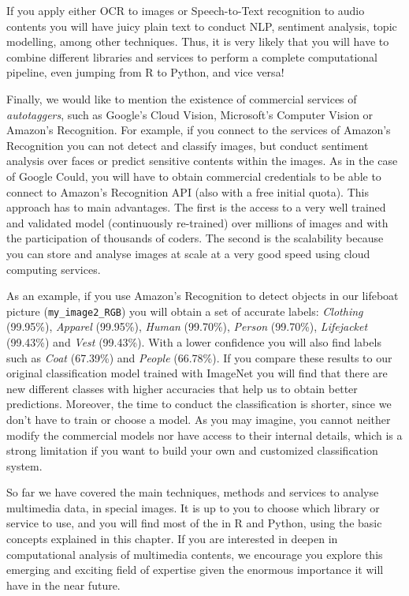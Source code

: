 If you apply either OCR to images or Speech-to-Text recognition to audio contents you will have juicy plain text to conduct NLP, sentiment analysis, topic modelling, among other techniques.  Thus, it is very likely that you will have to combine different libraries and services to perform a complete computational pipeline, even jumping from R to Python, and vice versa!

Finally, we would like to mention the existence of commercial services of \textit{autotaggers}, such as Google's Cloud Vision, Microsoft's Computer Vision or Amazon's Recognition. For example, if you connect to the services of Amazon's Recognition you can not detect and classify images, but conduct sentiment analysis over faces or predict sensitive contents within the images. As in the case of Google Could, you will have to obtain commercial credentials to be able to connect to Amazon's Recognition API (also with a free initial quota). This approach has to main advantages. The first is the access to a very well trained and validated model (continuously re-trained) over millions of images and with the participation of thousands of coders. The second is the scalability because you can store and analyse images at scale at a very good speed using cloud computing services.

As an example, if you use Amazon's Recognition to detect objects in our lifeboat picture (\texttt{my\_image2\_RGB}) you will obtain a set of accurate labels: \textit{Clothing} (99.95\%), \textit{Apparel} (99.95\%), \textit{Human} (99.70\%), \textit{Person} (99.70\%), \textit{Lifejacket} (99.43\%) and \textit{Vest} (99.43\%). With a lower confidence you will also find labels such as \textit{Coat} (67.39\%) and \textit{People} (66.78\%). If you compare these results to our original classification model trained with ImageNet you will find that there are new different classes with higher accuracies that help us to obtain better predictions. Moreover, the time to conduct the classification is shorter, since we don't have to train or choose a model. As you may imagine, you cannot neither modify the commercial models nor have access to their internal details, which is a strong limitation if you want to build your own and customized classification system.

So far we have covered the main techniques, methods and services to analyse multimedia data, in special images. It is up to you to choose which library or service to use, and you will find most of the in R and Python, using the basic concepts explained in this chapter. If you are interested in deepen in computational analysis of multimedia contents, we encourage you explore this emerging and exciting field of expertise given the enormous importance it will have in the near future. 